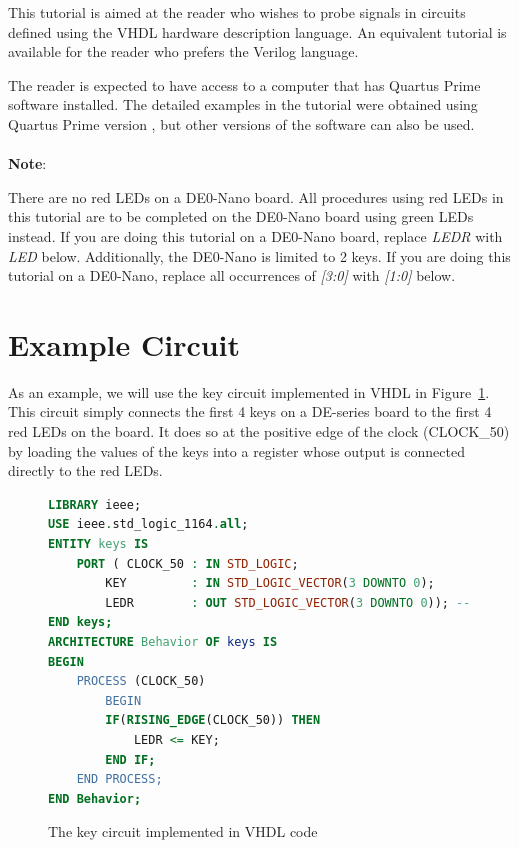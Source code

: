 \documentclass[11pt, twoside, pdftex]{article}
\begin{document}
This tutorial is aimed at the reader who wishes to probe signals in circuits defined
using the VHDL hardware description language. An equivalent tutorial is
available for the reader who prefers the Verilog language.
   
\noindent
The reader is expected to have access to a computer that has Quartus Prime software installed.
The detailed examples in the tutorial were obtained using Quartus Prime version \versnum, 
but other versions of the software can also be used. 
\\
\\
\noindent
{\bf Note}:

There are no red LEDs on a DE0-Nano board. All procedures using red LEDs in this tutorial are to be completed on the DE0-Nano board using green LEDs instead.
If you are doing this tutorial on a DE0-Nano board, replace {\it LEDR} with {\it LED} below.
Additionally, the DE0-Nano is limited to 2 keys. If you are doing this tutorial on a DE0-Nano, replace all occurrences of {\it [3:0]} with {\it [1:0]} below.

\section{Example Circuit}
As an example, we will use the key circuit implemented in VHDL in Figure~\ref{fig:1}. This circuit simply connects
the first 4 keys on a DE-series board to the first 4 red LEDs on the board. It does so at the
positive edge of the clock (CLOCK\_50) by loading the values of the keys into a register
whose output is connected directly to the red LEDs. 

\begin{figure}[H]
\begin{lstlisting}[language=VHDL, xleftmargin=1cm]
LIBRARY ieee;
USE ieee.std_logic_1164.all;
ENTITY keys IS
    PORT ( CLOCK_50 : IN STD_LOGIC;
        KEY         : IN STD_LOGIC_VECTOR(3 DOWNTO 0);
        LEDR        : OUT STD_LOGIC_VECTOR(3 DOWNTO 0)); -- red LEDs
END keys;
ARCHITECTURE Behavior OF keys IS
BEGIN
    PROCESS (CLOCK_50)
        BEGIN
        IF(RISING_EDGE(CLOCK_50)) THEN
            LEDR <= KEY;
        END IF;
    END PROCESS;
END Behavior;
\end{lstlisting}
     \caption{The key circuit implemented in VHDL code} 
	   \label{fig:1}
\end{figure}
\end{document}
